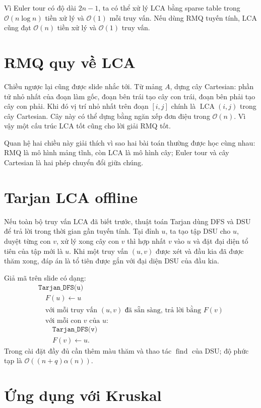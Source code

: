 \documentclass[11pt]{article}
\newcommand{\Oh}{\mathcal{O}}
\newcommand{\LCA}{\operatorname{LCA}}
\begin{document}
Vì Euler tour có độ dài \(2n-1\), ta có thể xử lý LCA bằng sparse table trong
\(\Oh(n\log n)\) tiền xử lý và \(\Oh(1)\) mỗi truy vấn. Nếu dùng RMQ tuyến
tính, LCA cũng đạt \(\Oh(n)\) tiền xử lý và \(\Oh(1)\) truy vấn.

\section{RMQ quy về LCA}

Chiều ngược lại cũng được slide nhắc tới. Từ mảng \(A\), dựng cây Cartesian:
phần tử nhỏ nhất của đoạn làm gốc, đoạn bên trái tạo cây con trái, đoạn bên
phải tạo cây con phải. Khi đó vị trí nhỏ nhất trên đoạn \([i,j]\) chính là
\(\LCA(i,j)\) trong cây Cartesian. Cây này có thể dựng bằng ngăn xếp đơn điệu
trong \(\Oh(n)\). Vì vậy một cấu trúc LCA tốt cũng cho lời giải RMQ tốt.

Quan hệ hai chiều này giải thích vì sao hai bài toán thường được học cùng
nhau: RMQ là mô hình mảng tĩnh, còn LCA là mô hình cây; Euler tour và cây
Cartesian là hai phép chuyển đổi giữa chúng.

\section{Tarjan LCA offline}

Nếu toàn bộ truy vấn LCA đã biết trước, thuật toán Tarjan dùng DFS và DSU để
trả lời trong thời gian gần tuyến tính. Tại đỉnh \(u\), ta tạo tập DSU cho
\(u\), duyệt từng con \(v\), xử lý xong cây con \(v\) thì hợp nhất \(v\) vào
\(u\) và đặt đại diện tổ tiên của tập mới là \(u\). Khi một truy vấn
\((u,v)\) được xét và đầu kia đã được thăm xong, đáp án là tổ tiên được gắn
với đại diện DSU của đầu kia.

Giả mã trên slide có dạng:
\[
\begin{array}{l}
\texttt{Tarjan\_DFS(u)}\\
\quad F(u)\leftarrow u\\
\quad \text{với mỗi truy vấn }(u,v)\text{ đã sẵn sàng, trả lời bằng }F(v)\\
\quad \text{với mỗi con }v\text{ của }u:\\
\quad\quad \texttt{Tarjan\_DFS(v)}\\
\quad\quad F(v)\leftarrow u.
\end{array}
\]
Trong cài đặt đầy đủ cần thêm màu thăm và thao tác \(\operatorname{find}\) của
DSU; độ phức tạp là \(\Oh((n+q)\alpha(n))\).

\section{Ứng dụng với Kruskal}
\end{document}
